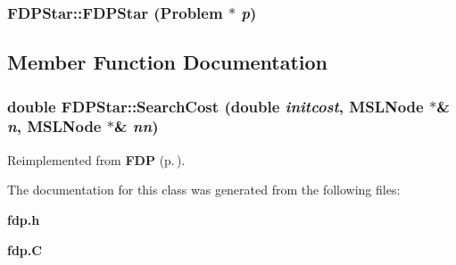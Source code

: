 \subsubsection{\setlength{\rightskip}{0pt plus 5cm}FDPStar::FDPStar ({\bf Problem} $\ast$ {\em p})}\label{classFDPStar_a0}




\subsection{Member Function Documentation}
\subsubsection{\setlength{\rightskip}{0pt plus 5cm}double FDPStar::Search\-Cost (double {\em initcost}, {\bf MSLNode} $\ast$\& {\em n}, {\bf MSLNode} $\ast$\& {\em nn})\hspace{0.3cm}{\tt  [protected, virtual]}}\label{classFDPStar_b0}




Reimplemented from {\bf FDP} {\rm (p.\,\pageref{classFDP_b0})}.

The documentation for this class was generated from the following files:\begin{CompactItemize}
\item 
{\bf fdp.h}\item 
{\bf fdp.C}\end{CompactItemize}

